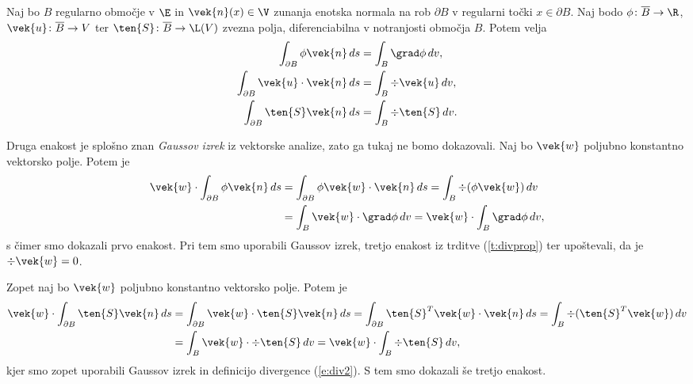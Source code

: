 \begin{izrek} \label{i:divtheo}
	Naj bo $B$ regularno območje v $\E$ in $\vek{n}(x)\in\V$ zunanja enotska normala
	na rob $\partial B$ v regularni točki $x\in\partial B$. Naj bodo $\phi\colon\overline{B}\to\R$,
	$\vek{u}\colon\overline{B}\to V$ ter $\ten{S}\colon\overline{B}\to\L(V)$
	zvezna polja, diferenciabilna v notranjosti območja $B$. Potem velja
	\begin{align*}
		\int_{\partial B} \phi\vek{n}\,ds &= \int_{B} \grad\phi\,dv, \\
		\int_{\partial B} \vek{u}\cdot\vek{n}\,ds &= \int_{B} \div\vek{u}\,dv, \\
		\int_{\partial B} \ten{S}\vek{n}\,ds &= \int_{B} \div\ten{S}\,dv.
	\end{align*}
\end{izrek}
\proof
	Druga enakost je splošno znan \emph{Gaussov izrek} iz vektorske analize, zato ga tukaj ne bomo dokazovali.
	Naj bo $\vek{w}$ poljubno konstantno vektorsko polje. Potem je
	\begin{align*}
		\vek{w}\cdot\int_{\partial B}\phi\vek{n}\,ds &= \int_{\partial B}\phi\vek{w}\cdot\vek{n}\,ds=
		\int_{B}\div(\phi\vek{w})\,dv \\
		&= \int_{B}\vek{w}\cdot\grad\phi \,dv = \vek{w}\cdot\int_{B}\grad\phi \,dv,
	\end{align*}
	s čimer smo dokazali prvo enakost.
	Pri tem smo uporabili Gaussov izrek, tretjo enakost iz trditve (\ref{t:divprop}) ter
	upoštevali, da je $\div\vek{w}=0$.
	
	Zopet naj bo $\vek{w}$ poljubno konstantno vektorsko polje. Potem je
	\begin{align*}
		\vek{w}\cdot\int_{\partial B}\ten{S}\vek{n}\,ds &= \int_{\partial B}\vek{w}\cdot\ten{S}\vek{n}\,ds=
		\int_{\partial B}\ten{S}^T\vek{w}\cdot\vek{n}\,ds=
		\int_{B}\div(\ten{S}^T\vek{w})\,dv \\ &=\int_{B}\vek{w}\cdot\div\ten{S}\,dv=
		\vek{w}\cdot\int_{B}\div\ten{S}\,dv,
	\end{align*}
	kjer smo zopet uporabili Gaussov izrek in definicijo divergence (\ref{e:div2}). S tem smo dokazali še tretjo enakost.
\endproof